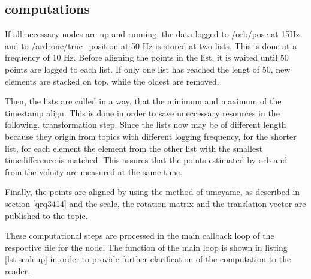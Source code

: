 	\subsection{computations}
	
	If all necessary nodes are up and running, the data  logged to /orb/pose at 15Hz and to /ardrone/true\_position at 50 Hz is stored at two lists. This is done at 
	a frequency of 10 Hz. Before aligning the points in the list, it is waited until 50 points are logged to each list. If only one list has reached 
	the lengt of 50, new elements are stacked on top, while the oldest are removed. 
	
	Then, the lists are culled in a way, that the minimum and maximum of the timestamp align. This is done in order to save uneccessary resources in the following.
	transformation step. Since the lists now may be of different length because they origin from topics with different logging frequency, 
	for the shorter list, for each element the element from the other list with the smallest timedifference is matched. This assures that the points 
	estimated by orb and from the voloity are measured at the same time. 
	
	Finally, the points are aligned by using the method of umeyame, as described in section \ref{qrq3414} and the scale, the rotation matrix and the translation
    vector are published to the topic. 
	
	These computational steps are processed in the main callback loop of the respoctive file for the node. The function of the main loop is shown in listing \ref{lst:scaleup} in order 
	to provide further clarification of the computation to the reader. 
	
